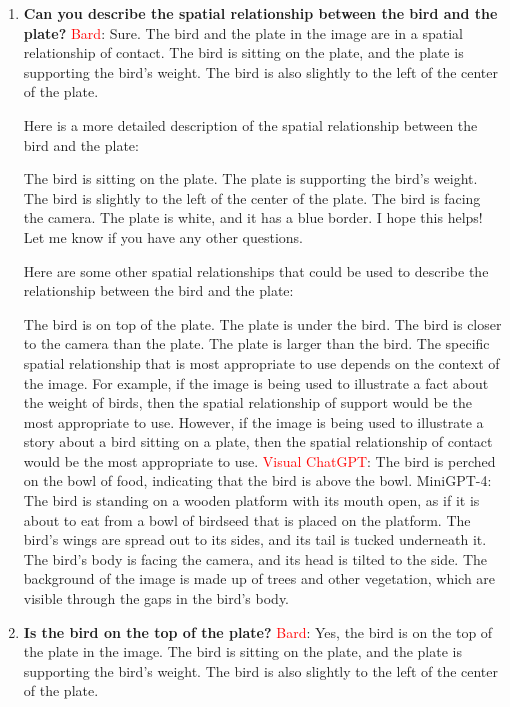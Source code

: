     \begin{enumerate}
        \item \textbf{Can you describe the spatial relationship between the bird and the plate?}
        \subitem \textcolor{Red}{Bard}:
        Sure. The bird and the plate in the image are in a spatial relationship of contact. The bird is sitting on the plate, and the plate is supporting the bird's weight. The bird is also slightly to the left of the center of the plate.
        
        Here is a more detailed description of the spatial relationship between the bird and the plate:
        
        The bird is sitting on the plate.
        The plate is supporting the bird's weight.
        The bird is slightly to the left of the center of the plate.
        The bird is facing the camera.
        The plate is white, and it has a blue border.
        I hope this helps! Let me know if you have any other questions.
        
        Here are some other spatial relationships that could be used to describe the relationship between the bird and the plate:
        
        The bird is on top of the plate.
        The plate is under the bird.
        The bird is closer to the camera than the plate.
        The plate is larger than the bird.
        The specific spatial relationship that is most appropriate to use depends on the context of the image. For example, if the image is being used to illustrate a fact about the weight of birds, then the spatial relationship of support would be the most appropriate to use. However, if the image is being used to illustrate a story about a bird sitting on a plate, then the spatial relationship of contact would be the most appropriate to use.
        \subitem \textcolor{red}{Visual ChatGPT}: The bird is perched on the bowl of food, indicating that the bird is above the bowl.
        \subitem MiniGPT-4: The bird is standing on a wooden platform with its mouth open, as if it is about to eat from a bowl of birdseed that is placed on the platform. The bird’s wings are spread out to its sides, and its tail is tucked underneath it. The bird’s body is facing the camera, and its head is tilted to the side. The background of the image is made up of trees and other vegetation, which are visible through the gaps in the bird’s body.
        \item \textbf{Is the bird on the top of the plate?}
        \subitem \textcolor{Red}{Bard}: 
        Yes, the bird is on the top of the plate in the image. The bird is sitting on the plate, and the plate is supporting the bird's weight. The bird is also slightly to the left of the center of the plate.
        

\end{enumerate}
